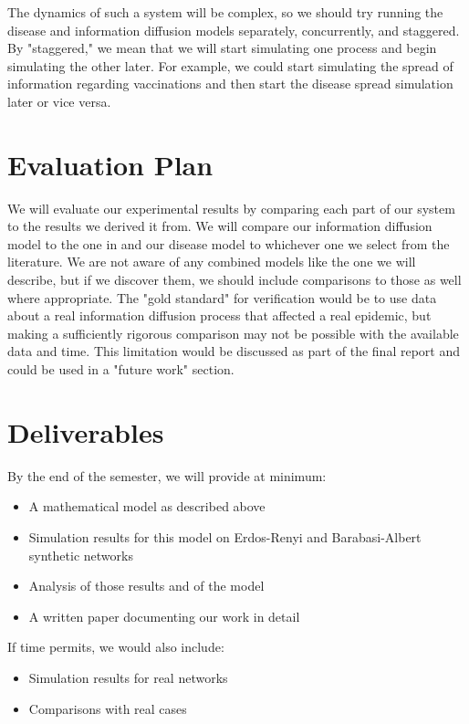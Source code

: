 \documentclass{article}
\begin{document}
The dynamics of such a system will be complex, so we should try running the disease and information diffusion models separately, concurrently, and staggered. By "staggered," we mean that we will start simulating one process and begin simulating the other later. For example, we could start simulating the spread of information regarding vaccinations and then start the disease spread simulation later or vice versa. 

\section{Evaluation Plan}
We will evaluate our experimental results by comparing each part of our system to the results we derived it from. We will compare our information diffusion model to the one in \cite{Tambuscio2015FactcheckingEO} and our disease model to whichever one we select from the literature. We are not aware of any combined models like the one we will describe, but if we discover them, we should include comparisons to those as well where appropriate. The "gold standard" for verification would be to use data about a real information diffusion process that affected a real epidemic, but making a sufficiently rigorous comparison may not be possible with the available data and time. This limitation would be discussed as part of the final report and could be used in a "future work" section.

\section{Deliverables}
By the end of the semester, we will provide at minimum:
\begin{itemize}
    \item A mathematical model as described above
    \item Simulation results for this model on Erdos-Renyi and Barabasi-Albert synthetic networks
    \item Analysis of those results and of the model
    \item A written paper documenting our work in detail
\end{itemize}
If time permits, we would also include:
\begin{itemize}
    \item Simulation results for real networks
    \item Comparisons with real cases
\end{itemize}
\end{document}
